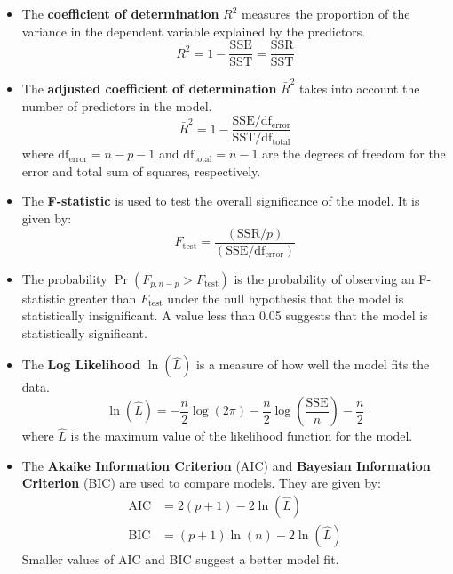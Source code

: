 \documentclass{article}
\begin{document}
\begin{itemize}
    \item The \textbf{coefficient of determination} \(R^2\) measures
          the proportion of the variance in the dependent variable
          explained by the predictors.
          \begin{equation*}
              R^2 = 1 - \frac{\mathrm{SSE}}{\mathrm{SST}} = \frac{\mathrm{SSR}}{\mathrm{SST}}
          \end{equation*}
    \item The \textbf{adjusted coefficient of determination}
          \(\bar{R}^2\) takes into account the number of predictors in
          the model.
          \begin{equation*}
              \bar{R}^2 = 1 - \frac{\mathrm{SSE} / \mathrm{df}_{\mathrm{error}} }{\mathrm{SST} / \mathrm{df}_{\mathrm{total}}}
          \end{equation*}
          where \(\mathrm{df}_{\mathrm{error}} = n - p - 1\) and
          \(\mathrm{df}_{\mathrm{total}} = n - 1\) are the degrees of freedom
          for the error and total sum of squares, respectively.
    \item The \textbf{F-statistic} is used to test the overall
          significance of the model. It is given by:
          \begin{equation*}
              F_{\mathrm{test}} = \frac{\left( \mathrm{SSR} / p \right)}{\left( \mathrm{SSE} / \mathrm{df}_{\mathrm{error}} \right)}
          \end{equation*}
    \item The probability \(\Pr{\left( F_{p, n - p} > F_{\mathrm{test}}
          \right)}\) is the probability of observing an F-statistic
          greater than \(F_{\mathrm{test}}\) under the null hypothesis
          that the model is statistically insignificant. A value less
          than 0.05 suggests that the model is statistically
          significant.
    \item The \textbf{Log Likelihood} \(\ln{\left( \hat{L} \right)}\)
          is a measure of how well the model fits the data.
          \begin{equation*}
              \ln{\left( \hat{L} \right)} = -\frac{n}{2} \log{\left( 2 \pi \right)} - \frac{n}{2} \log{\left( \frac{\mathrm{SSE}}{n} \right)} - \frac{n}{2}
          \end{equation*}
          where \(\hat{L}\) is the maximum value of the likelihood
          function for the model.
    \item The \textbf{Akaike Information Criterion} (AIC) and
          \textbf{Bayesian Information Criterion} (BIC) are used to
          compare models. They are given by:
          \begin{align*}
              \mathrm{AIC} & = 2\left( p + 1 \right) - 2 \ln{\left( \hat{L} \right)}                      \\
              \mathrm{BIC} & = \left( p + 1 \right) \ln{\left( n \right)} - 2 \ln{\left( \hat{L} \right)}
          \end{align*}
          Smaller values of AIC and BIC suggest a better model fit.
\end{itemize}
\end{document}
